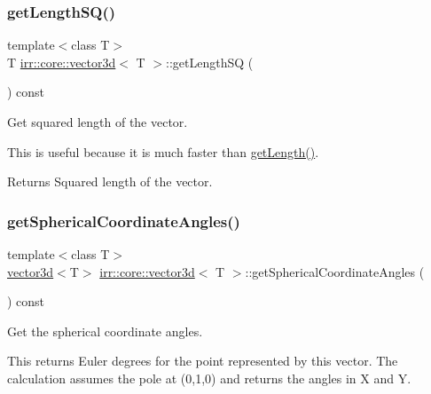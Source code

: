 \subsubsection{\texorpdfstring{get\+Length\+S\+Q()}{getLengthSQ()}\hspace{0.1cm}{\footnotesize\ttfamily [2/2]}}
{\footnotesize\ttfamily template$<$class T$>$ \\
T \hyperlink{classirr_1_1core_1_1vector3d}{irr\+::core\+::vector3d}$<$ T $>$\+::get\+Length\+SQ (\begin{DoxyParamCaption}{ }\end{DoxyParamCaption}) const\hspace{0.3cm}{\ttfamily [inline]}}



Get squared length of the vector. 

This is useful because it is much faster than \hyperlink{classirr_1_1core_1_1vector3d_a7f1d3aec798edf0b2c34594c7260ad0e}{get\+Length()}. \begin{DoxyReturn}{Returns}
Squared length of the vector. 
\end{DoxyReturn}
\mbox{\label{classirr_1_1core_1_1vector3d_ae65962051f40aabe305bbb71f1956b95}} 
\subsubsection{\texorpdfstring{get\+Spherical\+Coordinate\+Angles()}{getSphericalCoordinateAngles()}\hspace{0.1cm}{\footnotesize\ttfamily [1/2]}}
{\footnotesize\ttfamily template$<$class T$>$ \\
\hyperlink{classirr_1_1core_1_1vector3d}{vector3d}$<$T$>$ \hyperlink{classirr_1_1core_1_1vector3d}{irr\+::core\+::vector3d}$<$ T $>$\+::get\+Spherical\+Coordinate\+Angles (\begin{DoxyParamCaption}{ }\end{DoxyParamCaption}) const\hspace{0.3cm}{\ttfamily [inline]}}



Get the spherical coordinate angles. 

This returns Euler degrees for the point represented by this vector. The calculation assumes the pole at (0,1,0) and returns the angles in X and Y. \mbox{\label{classirr_1_1core_1_1vector3d_ae65962051f40aabe305bbb71f1956b95}} 
